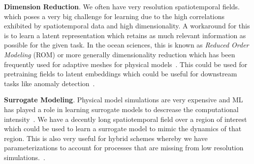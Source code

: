 \textbf{Dimension Reduction}. We often have very resolution spatiotemporal fields.
which poses a very big challenge for learning due to the high correlations exhibited by spatiotemporal data and high dimensionality.
A workaround for this is to learn a latent representation which retains as much relevant information as possible for the given task.
In the ocean sciences, this is known as \textit{Reduced Order Modeling} (ROM) or more generally dimensionality reduction which has been frequently used for adaptive meshes for physical models~\cite{NEMOEOF}.
This could be used for pretraining fields to latent embeddings which could be useful for downstream tasks like anomaly detection~\cite{SSTFLOWANOMALY}.


\textbf{Surrogate Modeling}. 
Physical model simulations are very expensive and ML has played a role in learning surrogate models to descrease the computational intensity~\cite{ML4OCN,MLCLOSURE}.
We have a decently long spatiotemporal field over a region of interest which could be used to learn a surrogate model to mimic the dynamics of that region.
This is also very useful for hybrid schemes whereby we have parameterizations to account for processes that are missing from low resolution simulations.~\cite{MLOCNPARAMETERIZATION,MLOCNPARAMETERIZATION2, MLOCNPARAMETERIZATION3, MLOCNPARAMETERIZATION4}.





